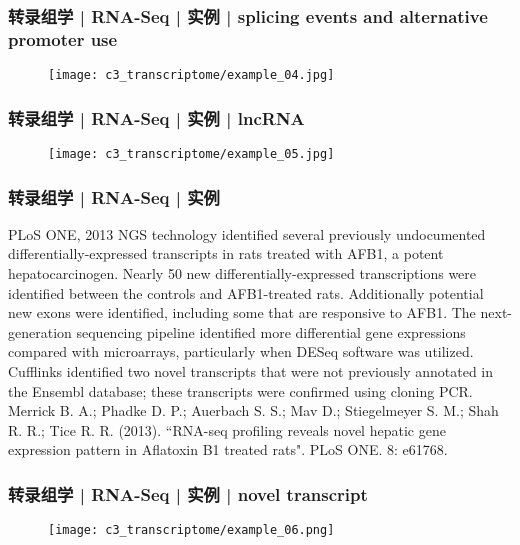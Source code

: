 \begin{frame}
  \frametitle{转录组学 | RNA-Seq | 实例 | splicing events and alternative promoter use}
  \begin{figure}
    \centering
    \texttt{[image: c3\_transcriptome/example\_04.jpg]}
  \end{figure}
\end{frame}

\begin{frame}
  \frametitle{转录组学 | RNA-Seq | 实例 | lncRNA}
  \begin{figure}
    \centering
    \texttt{[image: c3\_transcriptome/example\_05.jpg]}
  \end{figure}
\end{frame}

\begin{frame}
  \frametitle{转录组学 | RNA-Seq | 实例}
  \begin{block}{PLoS ONE, 2013}
  NGS technology identified several previously undocumented differentially-expressed transcripts in rats treated with AFB1, a potent hepatocarcinogen. Nearly 50 new differentially-expressed transcriptions were identified between the controls and AFB1-treated rats. Additionally potential new exons were identified, including some that are responsive to AFB1. The next-generation sequencing pipeline identified more differential gene expressions compared with microarrays, particularly when DESeq software was utilized. Cufflinks identified two novel transcripts that were not previously annotated in the Ensembl database; these transcripts were confirmed using cloning PCR.\\
  \vspace{0.5em}
Merrick B. A.; Phadke D. P.; Auerbach S. S.; Mav D.; Stiegelmeyer S. M.; Shah R. R.; Tice R. R. (2013). ``RNA-seq profiling reveals novel hepatic gene expression pattern in Aflatoxin B1 treated rats". PLoS ONE. 8: e61768. 
  \end{block}
\end{frame}

\begin{frame}
  \frametitle{转录组学 | RNA-Seq | 实例 | novel transcript}
  \begin{figure}
    \centering
    \texttt{[image: c3\_transcriptome/example\_06.png]}
  \end{figure}
\end{frame}

